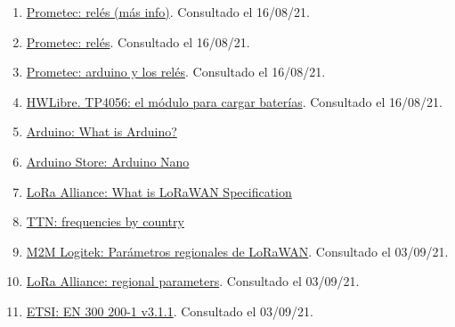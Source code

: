\documentclass[12pt]{article}
\begin{document}
\begin{enumerate}
			\item 
			\label{bib: prometec relés (más info)}
			\href{https://www.prometec.net/mas-sobre-reles/}{Prometec: relés (más info)}. Consultado el 16/08/21.
			
			\item 
			\label{bib: prometec relés}
			\href{https://www.prometec.net/reles-s4a/}{Prometec: relés}. Consultado el 16/08/21.
			
			\item 
			\label{bib: prometec relés y arduino}
			\href{https://www.prometec.net/reles/}{Prometec: arduino y los relés}. Consultado el 16/08/21.
			
			\item 
			\label{bib: hwlibre TP4056}
			\href{https://www.hwlibre.com/tp4056/}{HWLibre. TP4056: el módulo para cargar baterías}. Consultado el 16/08/21.
			
			\item
			\label{arduino intro}
			\href{https://www.arduino.cc/en/Guide/Introduction}{Arduino: What is Arduino?}
			
			\item
			\label{arduino nano}
			\href{https://store.arduino.cc/products/arduino-nano}{Arduino Store: Arduino Nano}
			
			\item
			\label{lora alliance what is lorawan}
			\href{https://lora-alliance.org/about-lorawan/}{LoRa Alliance: What is LoRaWAN Specification}
			
			\item
			\label{ttn freq plan}
			\href{https://www.thethingsnetwork.org/docs/lorawan/frequencies-by-country/index.html}{TTN: frequencies by country}
			
			\item
			\label{param regionales lorawan}
			\href{https://www.m2mlogitek.com/parametros-regionales-de-lorawan/}{M2M Logitek: Parámetros regionales de LoRaWAN}. Consultado el 03/09/21.
			
			\item
			\label{lora regional parameters}
			\href{https://lora-alliance.org/resource_hub/rp2-1-0-3-lorawan-regional-parameters/}{LoRa Alliance: regional parameters}. Consultado el 03/09/21.
			
			\item
			\label{etsi}
			\href{https://www.etsi.org/deliver/etsi_en/300200_300299/30022001/03.01.01_60/en_30022001v030101p.pdf}{ETSI: EN 300 200-1 v3.1.1}. Consultado el 03/09/21.
			

\end{enumerate}
\end{document}
